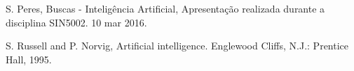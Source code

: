 \documentclass[conference]{IEEEtran}
\begin{document}
%
%
%
\begin{thebibliography}{1}

\bibitem{}
S. Peres, Buscas - Inteligência Artificial, Apresentação realizada durante a disciplina SIN5002. 10 mar 2016.


\bibitem{}
S. Russell and P. Norvig, Artificial intelligence. Englewood Cliffs, N.J.: Prentice Hall, 1995.

\end{thebibliography}




\end{document}
